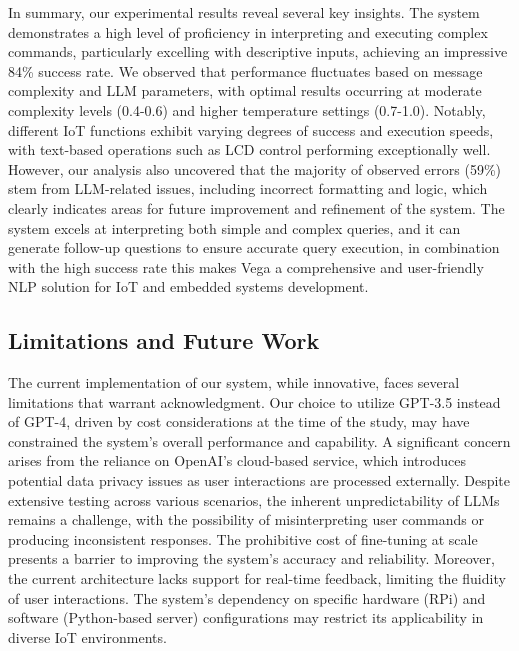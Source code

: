 \documentclass{ieeeaccess}
\begin{document}
In summary, our experimental results reveal several key insights. The system demonstrates a high level of proficiency in interpreting and executing complex commands, particularly excelling with descriptive inputs, achieving an impressive 84\% success rate. We observed that performance fluctuates based on message complexity and LLM parameters, with optimal results occurring at moderate complexity levels (0.4-0.6) and higher temperature settings (0.7-1.0). Notably, different IoT functions exhibit varying degrees of success and execution speeds, with text-based operations such as LCD control performing exceptionally well. However, our analysis also uncovered that the majority of observed errors (59\%) stem from LLM-related issues, including incorrect formatting and logic, which clearly indicates areas for future improvement and refinement of the system. The system excels at interpreting both simple and complex queries, and it can generate follow-up questions to ensure accurate query execution, in combination with the high success rate this makes Vega a comprehensive and user-friendly NLP solution for IoT and embedded systems development.


\subsection{Limitations and Future Work}
The current implementation of our system, while innovative, faces several limitations that warrant acknowledgment. Our choice to utilize GPT-3.5 instead of GPT-4, driven by cost considerations at the time of the study, may have constrained the system's overall performance and capability. A significant concern arises from the reliance on OpenAI's cloud-based service, which introduces potential data privacy issues as user interactions are processed externally. Despite extensive testing across various scenarios, the inherent unpredictability of LLMs remains a challenge, with the possibility of misinterpreting user commands or producing inconsistent responses. The prohibitive cost of fine-tuning at scale presents a barrier to improving the system's accuracy and reliability. Moreover, the current architecture lacks support for real-time feedback, limiting the fluidity of user interactions. The system's dependency on specific hardware (RPi) and software (Python-based server) configurations may restrict its applicability in diverse IoT environments.
\end{document}
